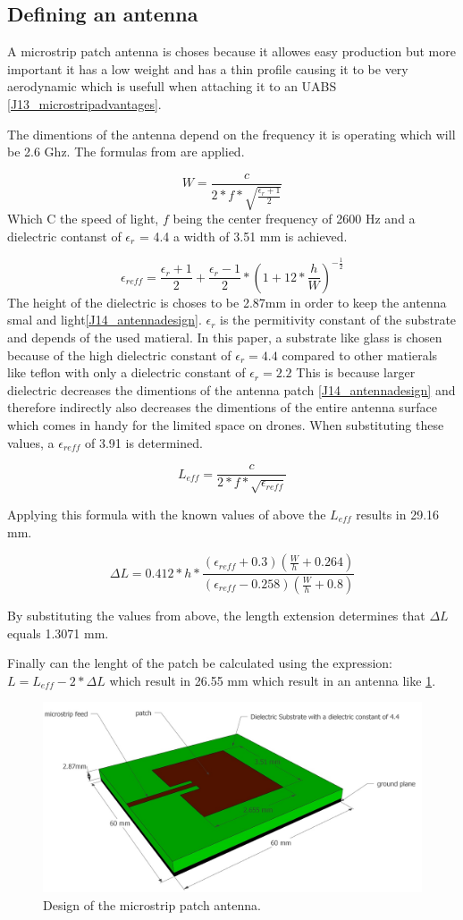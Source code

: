\subsection{Defining an antenna}
A microstrip patch antenna is choses because it allowes easy production but more important it has a low weight and has a thin profile causing it to be very aerodynamic which is usefull when attaching it to an \gls{UABS} \ref{J13_microstripadvantages}.

The dimentions of the antenna depend on the frequency it is operating which will be 2.6 Ghz.
The formulas from \cite{J14_antennadesign} are \cite{J15_antennadesign} applied. 





$$W = \frac{c}{2*f*\sqrt{\frac{\epsilon_r+1}{2}}}$$
Which C the speed of light, $f$ being the center frequency of 2600 Hz and a dielectric contanst of $\epsilon_r$ = 4.4 a width of 3.51 mm is achieved.

$$\epsilon_{reff} = \frac{\epsilon_r+1}{2}+  \frac{\epsilon_r-1}{2} * \left(1+12*\frac{h}{W}\right)^{-\frac{1}{2}}$$
The height of the dielectric is choses to be 2.87mm in order to keep the antenna smal and light\ref{J14_antennadesign}.
$\epsilon_r$ is the permitivity constant of the substrate and depends of the used matieral. In this paper, a substrate like glass is chosen because of the high dielectric constant of $\epsilon_r = 4.4$ compared to other matierals like teflon with only a dielectric constant of $\epsilon_r = 2.2$
This is because larger dielectric decreases the dimentions of the antenna patch \ref{J14_antennadesign} and therefore indirectly also decreases the dimentions of the entire antenna surface which comes in handy for the limited space on drones. When substituting these values, a $\epsilon_{reff}$ of 3.91 is determined.

$$ L_{eff} = \frac{c}{2*f*\sqrt{\epsilon_{reff}}} $$

Applying this formula with the known values of above the $L_{eff}$ results in 29.16 mm.

$$\Delta L = 0.412*h*\frac{(\epsilon_{reff}+0.3)\left(\frac{W}{h}+0.264\right)}{\left(\epsilon_{reff}-0.258\right)\left(\frac{W}{h}+0.8\right)}$$

By substituting the values from above, the length extension determines that $\Delta L$ equals 1.3071 mm.

Finally can the lenght of the patch be calculated using the expression: $L = L_{eff} - 2 * \Delta L$
which result in 26.55 mm which result in an antenna like \ref{fig:antennadesign}.


\begin{figure}[h]
  \includegraphics[width=\textwidth]{../images/MicrostripAntenna.jpg}
  \caption{Design of the microstrip patch antenna.}
  \label{fig:antennadesign}
\end{figure}
